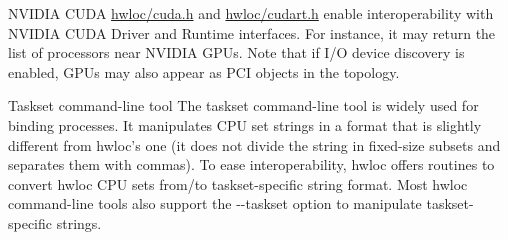 \begin{DoxyDescription}
\item[NVIDIA CUDA ]\hyperlink{a00028_source}{hwloc/cuda.h} and \hyperlink{a00029_source}{hwloc/cudart.h} enable interoperability with NVIDIA CUDA Driver and Runtime interfaces. For instance, it may return the list of processors near NVIDIA GPUs. Note that if I/O device discovery is enabled, GPUs may also appear as PCI objects in the topology. 


\item[Taskset command-\/line tool ]The taskset command-\/line tool is widely used for binding processes. It manipulates CPU set strings in a format that is slightly different from hwloc's one (it does not divide the string in fixed-\/size subsets and separates them with commas). To ease interoperability, hwloc offers routines to convert hwloc CPU sets from/to taskset-\/specific string format. Most hwloc command-\/line tools also support the -\/-\/taskset option to manipulate taskset-\/specific strings. 


\end{DoxyDescription}